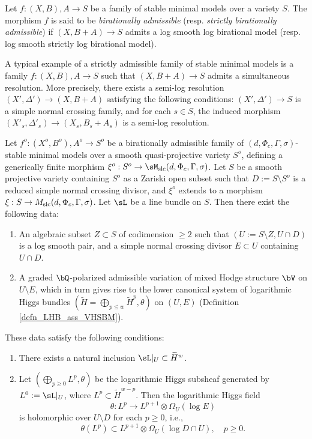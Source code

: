 \documentclass[11pt,letterpaper]{amsart}
\numberwithin{equation}{section}
\begin{document}
	\begin{defn}\label{defn_admissible}
		Let $f: (X, B), A \to S$ be a family of stable minimal models over a variety $S$. The morphism $f$ is said to be \emph{birationally admissible} (resp. \emph{strictly birationally admissible}) if $(X, B + A) \to S$ admits a log smooth log birational model (resp. log smooth strictly log birational model).
	\end{defn}
	A typical example of a strictly admissible family of stable minimal models is a family $f: (X, B), A \to S$ such that $(X, B + A) \to S$ admits a simultaneous resolution. More precisely, there exists a semi-log resolution $(X', \Delta') \to (X, B + A)$ satisfying the following conditions: $(X', \Delta') \to S$ is a simple normal crossing family, and for each $s \in S$, the induced morphism $(X'_s, \Delta'_s) \to (X_s, B_s + A_s)$ is a semi-log resolution.
	\begin{thm}\label{thm_big_Higgs_sheaf}
		Let $f^o: (X^o, B^o), A^o \to S^o$ be a birationally admissible family of $(d, \Phi_c, \Gamma, \sigma)$-stable minimal models over a smooth quasi-projective variety $S^o$, defining a generically finite morphism $\xi^o: S^o \to \sM_{\rm slc}(d, \Phi_c, \Gamma, \sigma)$. Let $S$ be a smooth projective variety containing $S^o$ as a Zariski open subset such that $D := S \setminus S^o$ is a reduced simple normal crossing divisor, and $\xi^o$ extends to a morphism $\xi: S \to M_{\rm slc}(d, \Phi_c, \Gamma, \sigma)$. Let $\sL$ be a line bundle on $S$. Then there exist the following data:  
		\begin{enumerate}
			\item An algebraic subset $Z \subset S$ of codimension $\geq 2$ such that $(U := S \setminus Z, U \cap D)$ is a log smooth pair, and a simple normal crossing divisor $E \subset U$ containing $U \cap D$.
			\item A graded $\bQ$-polarized admissible variation of mixed Hodge structure $\bV$ on $U \setminus E$, which in turn gives rise to the lower canonical system of logarithmic Higgs bundles $(\widetilde{H} = \bigoplus_{p\leq w} \widetilde{H}^{p}, \theta)$ on $(U,E)$ (Definition \ref{defn_LHB_ass_VHSBM}).
		\end{enumerate}
		These data satisfy the following conditions:  
		\begin{enumerate}
			\item There exists a natural inclusion $\sL|_U \subset \widetilde{H}^{w}$.  
			\item Let $(\bigoplus_{p\geq0} L^p, \theta)$ be the logarithmic Higgs subsheaf generated by $L^0 := \sL|_U$, where $L^p \subset \widetilde{H}^{w-p}$. Then the logarithmic Higgs field  
			$$
			\theta: L^p \to L^{p+1} \otimes \Omega_U(\log E)
			$$  
			is holomorphic over $U\setminus D$ for each $p\geq 0$, i.e.,  
			$$
			\theta(L^p) \subset L^{p+1} \otimes \Omega_U(\log D \cap U),\quad p\geq 0.
			$$  
		\end{enumerate}
	\end{thm}
\end{document}
